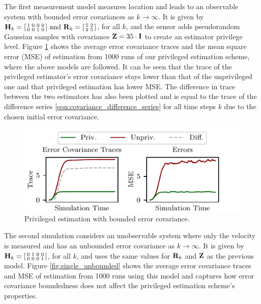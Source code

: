 \documentclass[letterpaper, 10 pt, conference]{ieeeconf}
\begin{document}
The first measurement model measures location and leads to an observable system with bounded error covariances as $k \rightarrow \infty$. It is given by 
$
   {{\mathbf{H}}}_k=
   \begin{bsmallmatrix}
      1 & 0 & 0 & 0\\
      0 & 0 & 1 & 0
   \end{bsmallmatrix}
   \text{ and }
   {\ensuremath{{\mathbf{R}}}}_k=
   \begin{bsmallmatrix}
      5 & 2\\
      2 & 5
   \end{bsmallmatrix}
$, 
for all $k$, and the sensor adds pseudorandom Gaussian samples with covariance ${{\mathbf{Z}}}=35 \cdot {\ensuremath{{\mathbf{I}}}}$ to create an estimator privilege level. Figure \ref{fig:single_bounded} shows the average error covariance traces and the mean square error (MSE) of estimation from 1000 runs of our privileged estimation scheme, where the above models are followed. It can be seen that the trace of the privileged estimator's error covariance stays lower than that of the unprivileged one and that privileged estimation has lower MSE. The difference in trace between the two estimators has also been plotted and is equal to the trace of the difference series \eqref{eqn:covariance_difference_series} for all time steps $k$ due to the chosen initial error covariance.

\begin{figure}[htbp]
   \centering
   \vspace{-.5 \baselineskip}
   \includegraphics{pictures/single_level_bounded.pdf}
   \caption{Privileged estimation with bounded error covariance.}
   \vspace{-.5 \baselineskip}
   \label{fig:single_bounded}
\end{figure}

The second simulation considers an unobservable system where only the velocity is measured and has an unbounded error covariance as $k \rightarrow \infty$. It is given by 
$
   {{\mathbf{H}}}_k=
   \begin{bsmallmatrix}
      0 & 1 & 0 & 0\\
      0 & 0 & 0 & 1
   \end{bsmallmatrix}
$, 
for all $k$, and uses the same values for ${{\mathbf{R}}}_k$ and ${{\mathbf{Z}}}$ as the previous model. Figure \ref{fig:single_unbounded} shows the average error covariance traces and MSE of estimation from 1000 runs using this model and captures how error covariance boundedness does not affect the privileged estimation scheme's properties.
\end{document}
